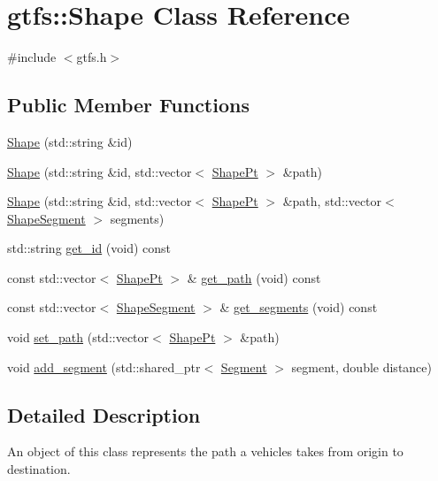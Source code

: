 \hypertarget{classgtfs_1_1Shape}{}\section{gtfs\+:\+:Shape Class Reference}
\label{classgtfs_1_1Shape}


{\ttfamily \#include $<$gtfs.\+h$>$}

\subsection*{Public Member Functions}
\begin{DoxyCompactItemize}
\item 
\hyperlink{classgtfs_1_1Shape_ace6a58f57452ab0d2830b518a0ed2bde}{Shape} (std\+::string \&id)
\item 
\hyperlink{classgtfs_1_1Shape_a17adce0bcc4f7f7b159a08f8fa8eed56}{Shape} (std\+::string \&id, std\+::vector$<$ \hyperlink{structgtfs_1_1ShapePt}{Shape\+Pt} $>$ \&path)
\item 
\hyperlink{classgtfs_1_1Shape_af7205aeb0d641d27e01df87a8351283e}{Shape} (std\+::string \&id, std\+::vector$<$ \hyperlink{structgtfs_1_1ShapePt}{Shape\+Pt} $>$ \&path, std\+::vector$<$ \hyperlink{structgtfs_1_1ShapeSegment}{Shape\+Segment} $>$ segments)
\item 
std\+::string \hyperlink{classgtfs_1_1Shape_ad8f8c0c5c19d4a8e840be1ed9a89de9e}{get\+\_\+id} (void) const
\item 
const std\+::vector$<$ \hyperlink{structgtfs_1_1ShapePt}{Shape\+Pt} $>$ \& \hyperlink{classgtfs_1_1Shape_a3b9c24a3ec0de99e4e7ac2fe2bb128a0}{get\+\_\+path} (void) const
\item 
const std\+::vector$<$ \hyperlink{structgtfs_1_1ShapeSegment}{Shape\+Segment} $>$ \& \hyperlink{classgtfs_1_1Shape_ab6959c8c957c2548313e4cf76bd2a2dd}{get\+\_\+segments} (void) const
\item 
void \hyperlink{classgtfs_1_1Shape_a39e7bb353e89f954d36eb7f9ca4820b9}{set\+\_\+path} (std\+::vector$<$ \hyperlink{structgtfs_1_1ShapePt}{Shape\+Pt} $>$ \&path)
\item 
void \hyperlink{classgtfs_1_1Shape_afb5bfd99bafb82eb085198218fe13342}{add\+\_\+segment} (std\+::shared\+\_\+ptr$<$ \hyperlink{classgtfs_1_1Segment}{Segment} $>$ segment, double distance)
\end{DoxyCompactItemize}


\subsection{Detailed Description}
An object of this class represents the path a vehicles takes from origin to destination.

